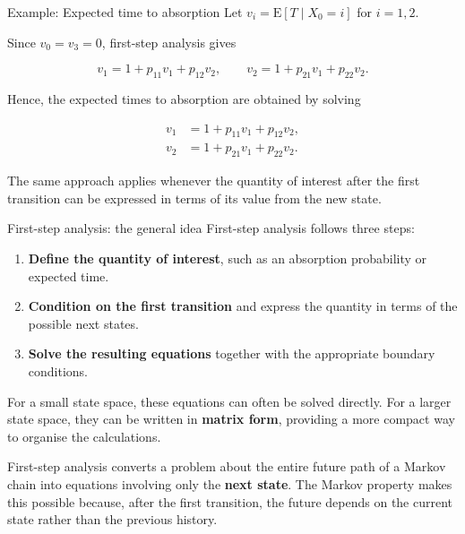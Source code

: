 \documentclass[
  ignorenonframetext,
  aspectratio=169,
]{beamer}
\providecommand{\tightlist}{%
  \setlength{\itemsep}{0pt}\setlength{\parskip}{0pt}}
\begin{document}
\begin{frame}{Example: Expected time to absorption}
\protect{}\label{example-expected-time-to-absorption-2}
Let \(v_i=\mathrm{E}[T\mid X_0=i]\) for \(i=1,2\).

Since \(v_0=v_3=0\), first-step analysis gives

\[
v_1=1+p_{11}v_1+p_{12}v_2,
\qquad
v_2=1+p_{21}v_1+p_{22}v_2.
\]

Hence, the expected times to absorption are obtained by solving

\[
\begin{aligned}
v_1 &=1+p_{11}v_1+p_{12}v_2,\\
v_2 &=1+p_{21}v_1+p_{22}v_2.
\end{aligned}
\]

The same approach applies whenever the quantity of interest after the
first transition can be expressed in terms of its value from the new
state.
\end{frame}

\begin{frame}{First-step analysis: the general idea}
\protect{}\label{first-step-analysis-the-general-idea}
First-step analysis follows three steps:

\begin{enumerate}
\tightlist
\item
  \textbf{Define the quantity of interest}, such as an absorption
  probability or expected time.
\item
  \textbf{Condition on the first transition} and express the quantity in
  terms of the possible next states.
\item
  \textbf{Solve the resulting equations} together with the appropriate
  boundary conditions.
\end{enumerate}

For a small state space, these equations can often be solved directly.
For a larger state space, they can be written in \textbf{matrix form},
providing a more compact way to organise the calculations.

\begin{tcolorbox}[enhanced jigsaw, arc=.35mm, bottomrule=.15mm, bottomtitle=1mm, breakable, colback=white, colbacktitle=quarto-callout-note-color!10!white, colframe=quarto-callout-note-color-frame, coltitle=black, left=2mm, leftrule=.75mm, opacityback=0, opacitybacktitle=0.6, rightrule=.15mm, title=\textcolor{quarto-callout-note-color}{\faInfo}\hspace{0.5em}{Key idea}, titlerule=0mm, toprule=.15mm, toptitle=1mm]

First-step analysis converts a problem about the entire future path of a
Markov chain into equations involving only the \textbf{next state}. The
Markov property makes this possible because, after the first transition,
the future depends on the current state rather than the previous
history.

\end{tcolorbox}
\end{frame}
\end{document}
